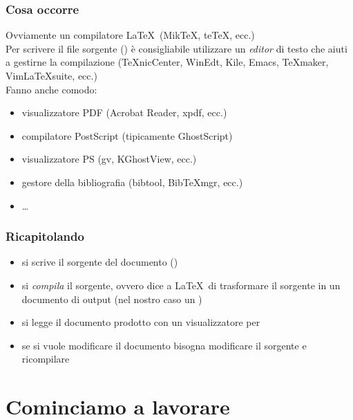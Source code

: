 \documentclass[svgnames,%
	ucs,%
	pdftex]{guitbeamer}
\begin{document}
\begin{frame}
  \frametitle{Cosa occorre}
	Ovviamente un compilatore \LaTeX\ (\alert{Mik\TeX}, \alert{te\TeX}, ecc.)\\
  \medskip
	Per scrivere il file sorgente () \`e consigliabile
	utilizzare un \emph{editor}\/ di testo che aiuti a gestirne la
	compilazione (\alert{\TeX nicCenter}, \alert{WinEdt}, \alert{Kile},
	\alert{Emacs}, \alert{\TeX maker}, \alert{Vim\LaTeX suite}, ecc.)\\
  \medskip
	Fanno anche comodo:
	\begin{itemize}
		\item visualizzatore PDF (\alert{Acrobat Reader}, \alert{xpdf}, ecc.)
		\item compilatore PostScript (tipicamente \alert{GhostScript})
		\item visualizzatore PS (\alert{gv}, \alert{KGhostView}, ecc.)	
		\item gestore della bibliografia (\alert{bibtool}, \alert{BibTeXmgr}, ecc.)
		\item \dots
	\end{itemize}
\end{frame}

\begin{frame}
  \frametitle{Ricapitolando} 
	\begin{itemize}[<+->]
		\item si scrive il sorgente del documento ()
		\item si \emph{compila} il sorgente, ovvero dice a \LaTeX\ di trasformare il sorgente in un documento di output (nel nostro caso un )
		\item si legge il documento prodotto con un visualizzatore per 
		\item se si vuole modificare il documento bisogna modificare il	sorgente e ricompilare
	\end{itemize}
\end{frame}
\section{Cominciamo a lavorare}
\end{document}
